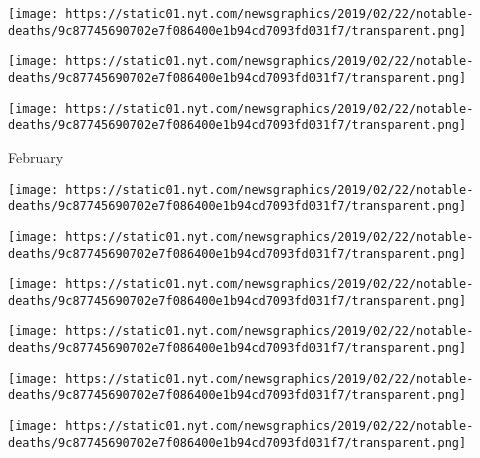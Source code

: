 \href{https://www.nytimes.com/2019/03/02/obituaries/zhores-alferov-dead.html}{}

\texttt{[image: https://static01.nyt.com/newsgraphics/2019/02/22/notable-deaths/9c87745690702e7f086400e1b94cd7093fd031f7/transparent.png]}

\href{https://www.nytimes.com/2019/03/01/obituaries/charles-mccarry-dead.html}{}

\texttt{[image: https://static01.nyt.com/newsgraphics/2019/02/22/notable-deaths/9c87745690702e7f086400e1b94cd7093fd031f7/transparent.png]}

\href{https://www.nytimes.com/2019/03/01/obituaries/katherine-helmond-dead.html}{}

\texttt{[image: https://static01.nyt.com/newsgraphics/2019/02/22/notable-deaths/9c87745690702e7f086400e1b94cd7093fd031f7/transparent.png]}

February

\href{https://www.nytimes.com/2019/02/28/obituaries/edward-nixon-dead.html}{}

\texttt{[image: https://static01.nyt.com/newsgraphics/2019/02/22/notable-deaths/9c87745690702e7f086400e1b94cd7093fd031f7/transparent.png]}

\href{https://www.nytimes.com/2019/02/28/obituaries/andre-previn-dead.html}{}

\texttt{[image: https://static01.nyt.com/newsgraphics/2019/02/22/notable-deaths/9c87745690702e7f086400e1b94cd7093fd031f7/transparent.png]}

\href{https://www.nytimes.com/2019/02/27/obituaries/carrie-ann-lucas-dead.html}{}

\texttt{[image: https://static01.nyt.com/newsgraphics/2019/02/22/notable-deaths/9c87745690702e7f086400e1b94cd7093fd031f7/transparent.png]}

\href{https://www.nytimes.com/2019/02/25/obituaries/mac-wiseman-dead.html}{}

\texttt{[image: https://static01.nyt.com/newsgraphics/2019/02/22/notable-deaths/9c87745690702e7f086400e1b94cd7093fd031f7/transparent.png]}

\href{https://www.nytimes.com/2019/02/26/obituaries/jeraldine-saunders-dead.html}{}

\texttt{[image: https://static01.nyt.com/newsgraphics/2019/02/22/notable-deaths/9c87745690702e7f086400e1b94cd7093fd031f7/transparent.png]}

\href{https://www.nytimes.com/2019/02/24/obituaries/hilde-zadek-dead-at-101.html}{}

\texttt{[image: https://static01.nyt.com/newsgraphics/2019/02/22/notable-deaths/9c87745690702e7f086400e1b94cd7093fd031f7/transparent.png]}

